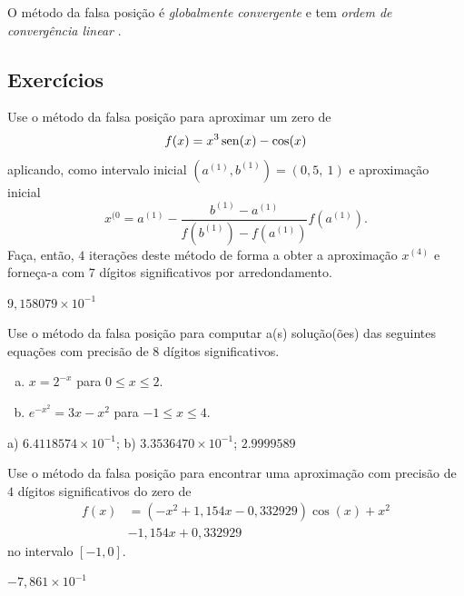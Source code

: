 \begin{obs}
  O método da falsa posição é \emph{globalmente convergente} e tem \emph{ordem de convergência linear} \cite[Seção 8.3]{Ralston2001a}.
\end{obs}

\subsection{Exercícios}

\begin{exer}
  Use o método da falsa posição para aproximar um zero de
  \begin{equation}
    f(x) = x^3\operatorname{sen}(x)-\cos(x)
  \end{equation}
  aplicando, como intervalo inicial $(a^{(1)}, b^{(1)}) = (0,5, ~1)$ e aproximação inicial
  \begin{equation}
    x^{(0} = a^{(1)} - \frac{b^{(1)}-a^{(1)}}{f(b^{(1)})-f(a^{(1)})}f(a^{(1)}).
  \end{equation}
  Faça, então, $4$ iterações deste método de forma a obter a aproximação $x^{(4)}$ e forneça-a com $7$ dígitos significativos por arredondamento.
\end{exer}
\begin{resp}
  $9,158079\times 10^{-1}$
\end{resp}

\begin{exer}
  Use o método da falsa posição para computar a(s) solução(ões) das seguintes equações com precisão de 8 dígitos significativos.
  \begin{enumerate}[a)]
  \item $x = 2^{-x}$ para $0\leq x \leq 2$.
  \item $e^{-x^2} = 3x - x^2$ para $-1\leq x\leq 4$.
  \end{enumerate}
\end{exer}
\begin{resp}
  a) $6.4118574\times 10^{-1}$; b) $3.3536470\times 10^{-1}$; $2.9999589$
\end{resp}

\begin{exer}
  Use o método da falsa posição para encontrar uma aproximação com precisão de $4$ dígitos significativos do zero de 
  \begin{equation}
    \begin{aligned}
      f(x) &= (-x^2+1,154x-0,332929)\cos(x) + x^2 \\
           &- 1,154x + 0,332929
    \end{aligned}
\end{equation}
  no intervalo $[-1, 0]$.
\end{exer}
\begin{resp}
  $-7,861\times 10^{-1}$
\end{resp}

